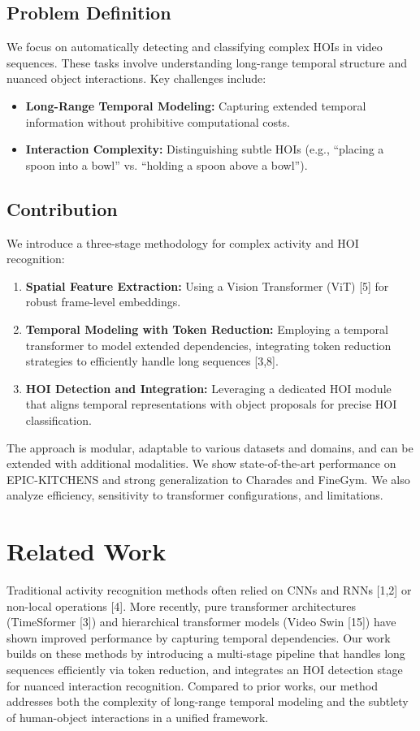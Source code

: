 \documentclass{article}
\begin{document}
\subsection{Problem Definition}
We focus on automatically detecting and classifying complex HOIs in video sequences. These tasks involve understanding long-range temporal structure and nuanced object interactions. Key challenges include:
\begin{itemize}
    \item \textbf{Long-Range Temporal Modeling:} Capturing extended temporal information without prohibitive computational costs.
    \item \textbf{Interaction Complexity:} Distinguishing subtle HOIs (e.g., “placing a spoon into a bowl” vs. “holding a spoon above a bowl”).
\end{itemize}

\subsection{Contribution}
We introduce a three-stage methodology for complex activity and HOI recognition:
\begin{enumerate}
    \item \textbf{Spatial Feature Extraction:} Using a Vision Transformer (ViT) [5] for robust frame-level embeddings.
    \item \textbf{Temporal Modeling with Token Reduction:} Employing a temporal transformer to model extended dependencies, integrating token reduction strategies to efficiently handle long sequences [3,8].
    \item \textbf{HOI Detection and Integration:} Leveraging a dedicated HOI module that aligns temporal representations with object proposals for precise HOI classification.
\end{enumerate}

The approach is modular, adaptable to various datasets and domains, and can be extended with additional modalities. We show state-of-the-art performance on EPIC-KITCHENS and strong generalization to Charades and FineGym. We also analyze efficiency, sensitivity to transformer configurations, and limitations.

\section{Related Work}
Traditional activity recognition methods often relied on CNNs and RNNs [1,2] or non-local operations [4]. More recently, pure transformer architectures (TimeSformer [3]) and hierarchical transformer models (Video Swin [15]) have shown improved performance by capturing temporal dependencies. Our work builds on these methods by introducing a multi-stage pipeline that handles long sequences efficiently via token reduction, and integrates an HOI detection stage for nuanced interaction recognition. Compared to prior works, our method addresses both the complexity of long-range temporal modeling and the subtlety of human-object interactions in a unified framework.
\end{document}
